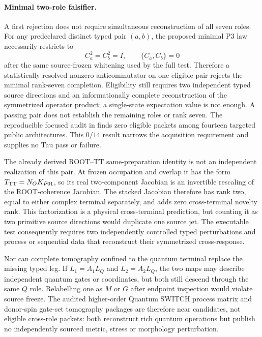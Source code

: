 \documentclass[11pt]{article}
\begin{document}
\paragraph{Minimal two-role falsifier.}
A first rejection does not require simultaneous reconstruction of all seven
roles.  For any predeclared distinct typed pair $(a,b)$, the proposed minimal
P3 law necessarily restricts to
\begin{equation}
 C_a^2=C_b^2=I,
 \qquad
 \{C_a,C_b\}=0
 \label{eq:minimalpairtest}
\end{equation}
after the same source-frozen whitening used by the full test.  Therefore a
statistically resolved nonzero anticommutator on one eligible pair rejects the
minimal rank-seven completion.  Eligibility still requires two independent
typed source directions and an informationally complete reconstruction of the
symmetrized operator product; a single-state expectation value is not enough.
A passing pair does not establish the remaining roles or rank seven.  The
reproducible focused audit in
 finds zero eligible packets
among fourteen targeted public architectures.  This $0/14$ result narrows the
acquisition requirement and supplies no Tau pass or failure.

The already derived ROOT--TT same-preparation identity is not an independent
realization of this pair.  At frozen occupation and overlap it has the form
$T_{\rm TT}=N_OK\rho_{01}$, so its real two-component Jacobian is an
invertible rescaling of the ROOT-coherence Jacobian.  The stacked Jacobian
therefore has rank two, equal to either complex terminal separately, and adds
zero cross-terminal novelty rank.  This factorization is a physical
cross-terminal prediction, but counting it as two primitive source directions
would duplicate one source jet.  The executable test consequently requires
two independently controlled typed perturbations and process or sequential
data that reconstruct their symmetrized cross-response.

Nor can complete tomography confined to the quantum terminal replace the
missing typed leg.  If $L_1=A_1L_Q$ and $L_2=A_2L_Q$, the two maps may describe
independent quantum gates or coordinates, but both still descend through the
same $Q$ role.  Relabelling one as $M$ or $G$ after endpoint inspection would
violate source freeze.  The audited higher-order Quantum SWITCH process matrix
and donor-spin gate-set tomography packages are therefore near candidates,
not eligible cross-role packets: both reconstruct rich quantum operations but
publish no independently sourced metric, stress or morphology perturbation.
\end{document}
